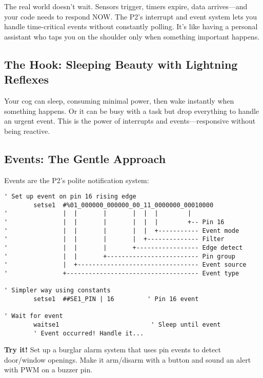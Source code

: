 \documentclass[11pt]{book}
\begin{document}
The real world doesn't wait. Sensors trigger, timers expire, data
arrives---and your code needs to respond NOW. The P2's interrupt and
event system lets you handle time-critical events without constantly
polling. It's like having a personal assistant who taps you on the
shoulder only when something important happens.

\hypertarget{the-hook-sleeping-beauty-with-lightning-reflexes}{%
\subsection{The Hook: Sleeping Beauty with Lightning
Reflexes}\label{the-hook-sleeping-beauty-with-lightning-reflexes}}

Your cog can sleep, consuming minimal power, then wake instantly when
something happens. Or it can be busy with a task but drop everything to
handle an urgent event. This is the power of interrupts and
events---responsive without being reactive.

\hypertarget{events-the-gentle-approach}{%
\subsection{Events: The Gentle
Approach}\label{events-the-gentle-approach}}

Events are the P2's polite notification system:

\begin{lstlisting}
' Set up event on pin 16 rising edge
        setse1  #%01_000000_000000_00_11_0000000_00010000
'               |  |       |       |  |  |        |
'               |  |       |       |  |  |        +-- Pin 16
'               |  |       |       |  |  +----------- Event mode
'               |  |       |       |  +-------------- Filter
'               |  |       |       +----------------- Edge detect
'               |  |       +------------------------- Pin group
'               |  +--------------------------------- Event source
'               +------------------------------------ Event type

' Simpler way using constants
        setse1  ##SE1_PIN | 16         ' Pin 16 event

' Wait for event
        waitse1                         ' Sleep until event
        ' Event occurred! Handle it...
\end{lstlisting}

\textbf{Try it!} Set up a burglar alarm system that uses pin events to
detect door/window openings. Make it arm/disarm with a button and sound
an alert with PWM on a buzzer pin.
\end{document}
